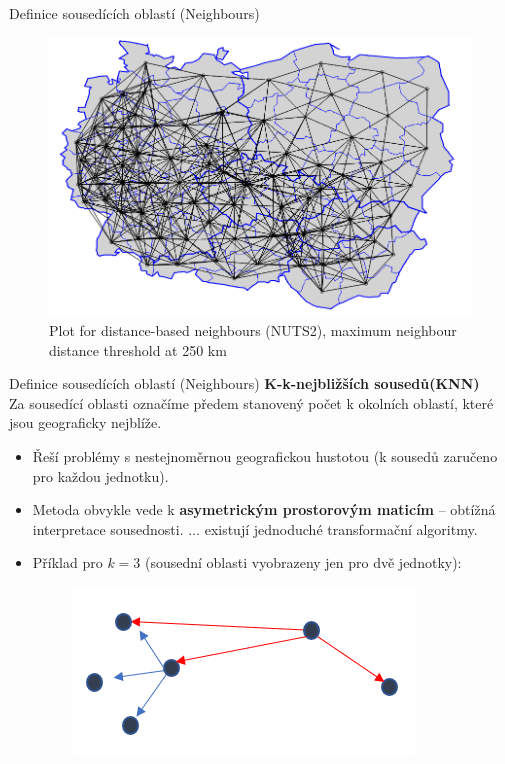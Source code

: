 \documentclass{beamer}
\begin{document}
\begin{frame}{Definice sousedících oblastí (Neighbours)}
\begin{figure}
	\includegraphics[width=.7\textwidth]{IMG/sp_neigb.PNG}
	\caption{Plot for distance-based neighbours (NUTS2), maximum neighbour distance threshold at 250 km}
\end{figure}
\end{frame}
\begin{frame}{Definice sousedících oblastí (Neighbours)}
\textbf{K-k-nejbližších sousedů(KNN)} \\
Za sousedící oblasti označíme předem stanovený počet k okolních oblastí, které jsou geograficky nejblíže. 
\begin{itemize}
	\item Řeší problémy s nestejnoměrnou geografickou hustotou (k sousedů zaručeno pro každou jednotku).
	\item Metoda obvykle vede k \textbf{asymetrickým prostorovým maticím} – obtížná interpretace sousednosti. $\dots$  existují jednoduché transformační algoritmy. 
	
	\item Příklad pro $k = 3$   (sousední oblasti vyobrazeny jen pro dvě jednotky):
	\begin{figure}
		\includegraphics[width=.2\textwidth]{IMG/sp_neigb2.PNG}
	\end{figure}
\end{itemize}
\end{frame}
\end{document}
